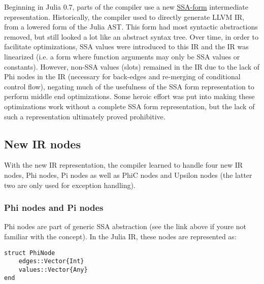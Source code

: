 Beginning in Julia 0.7, parts of the compiler use a new \href{https://en.wikipedia.org/wiki/Static\_single\_assignment\_form}{SSA-form} intermediate representation. Historically, the compiler used to directly generate LLVM IR, from a lowered form of the Julia AST. This form had most syntactic abstractions removed, but still looked a lot like an abstract syntax tree. Over time, in order to facilitate optimizations, SSA values were introduced to this IR and the IR was linearized (i.e. a form where function arguments may only be SSA values or constants). However, non-SSA values (slots) remained in the IR due to the lack of Phi nodes in the IR (necessary for back-edges and re-merging of conditional control flow), negating much of the usefulness of the SSA form representation to perform middle end optimizations. Some heroic effort was put into making these optimizations work without a complete SSA form representation, but the lack of such a representation ultimately proved prohibitive.



\hypertarget{14402415240566144810}{}


\subsection{New IR nodes}



With the new IR representation, the compiler learned to handle four new IR nodes, Phi nodes, Pi nodes as well as PhiC nodes and Upsilon nodes (the latter two are only used for exception handling).



\hypertarget{919068206461821671}{}


\subsubsection{Phi nodes and Pi nodes}



Phi nodes are part of generic SSA abstraction (see the link above if you{\textquotesingle}re not familiar with the concept). In the Julia IR, these nodes are represented as:




\begin{lstlisting}
struct PhiNode
    edges::Vector{Int}
    values::Vector{Any}
end
\end{lstlisting}



